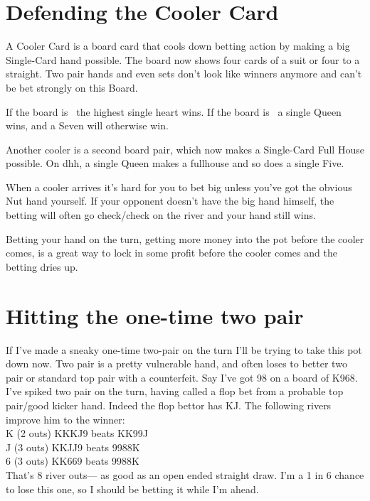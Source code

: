 \section{Defending the Cooler Card}

A Cooler Card is a board card that cools down betting action by making
a big Single-Card hand possible. The board now shows
four cards of a suit or four to a straight.
Two pair hands and even sets don't look like winners
anymore and can't be bet strongly on this Board.

If the board is \tenh\nineh\sixh\trec\fourh\, the highest single heart wins.
If the board is \Jc\tens\nineh\tred\eigc\, a single Queen wins,
and a Seven will otherwise win.

Another cooler is a second board pair, which now makes a Single-Card
Full House possible. On \Qc\5d\5h\4h\Qh, a single Queen makes a
fullhouse and so does a single Five.

When a cooler arrives it's hard for you to bet big unless you've got
the obvious Nut hand yourself. If your opponent doesn't have the big
hand himself, the betting will often go check/check on the river
and your hand still wins.

Betting your hand on the turn, getting more money into the pot before
the cooler comes, is a great way to lock in some profit before the
cooler comes and the betting dries up.

\section{Hitting the one-time two pair}

If I've made a sneaky one-time two-pair on the turn I'll be trying to
take this pot down now. Two pair is a pretty vulnerable hand, and
often loses to better two pair or standard top pair with a counterfeit.
Say I've got 98 on a board of K968.  I've spiked two pair on the turn,
having called a flop bet from a probable top pair/good kicker hand.
Indeed the flop bettor has KJ. The following rivers improve him to the
winner: \\
K (2 outs) KKKJ9 beats KK99J \\
J (3 outs) KKJJ9 beats 9988K \\
6 (3 outs) KK669 beats 9988K \\

That's 8 river outs--- as good as an open ended straight draw. I'm a 1 in 6
chance to lose this one, so I should be betting it while I'm ahead.

